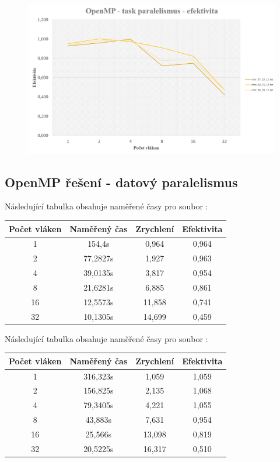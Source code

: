 \documentclass{article}
\begin{document}
\begin{figure}[H]
    \centering
    \includegraphics[width=\textwidth]{EfektivitaTask.png}
\end{figure}


\subsection{OpenMP řešení - datový paralelismus}
Následující tabulka obsahuje naměřené časy pro soubor :
\begin{table}[H]\centering
    \begin{tabular}{|c|c|c|c|}
        \hline \textbf{Počet vláken} & \textbf{Naměřený čas} & \textbf{Zrychlení} & \textbf{Efektivita} \\ \hline \hline
        1 & 154,4s & 0,964 & 0,964 \\ \hline
        2 & 77,2827s & 1,927 & 0,963 \\ \hline
        4 & 39,0135s & 3,817 & 0,954 \\ \hline
        8 & 21,6281s & 6,885 & 0,861 \\ \hline
        16 & 12,5573s & 11,858 & 0,741 \\ \hline
        32 &10,1305s & 14,699 & 0,459 \\ \hline
    \end{tabular}
\end{table} 
\noindent Následující tabulka obsahuje naměřené časy pro soubor :
\begin{table}[H]\centering
    \begin{tabular}{|c|c|c|c|}
        \hline \textbf{Počet vláken} & \textbf{Naměřený čas} & \textbf{Zrychlení} & \textbf{Efektivita} \\ \hline \hline
        1 & 316,323s & 1,059 & 1,059 \\ \hline
        2 & 156,825s & 2,135 & 1,068 \\ \hline
        4 & 79,3405s & 4,221 & 1,055 \\ \hline
        8 & 43,883s & 7,631 & 0,954 \\ \hline
        16 & 25,566s & 13,098 & 0,819 \\ \hline
        32 & 20,5225s & 16,317 & 0,510 \\ \hline
    \end{tabular}
\end{table} 
\end{document}
